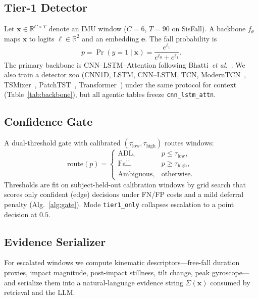 \documentclass[journal]{IEEEtran}
\begin{document}


\subsection{Tier-1 Detector}
Let $\mathbf{x}\in\mathbb{R}^{C\times T}$ denote an IMU window ($C{=}6$, $T{=}90$ on SisFall). A backbone $f_\theta$ maps $\mathbf{x}$ to logits $\boldsymbol{\ell}\in\mathbb{R}^{2}$ and an embedding $\mathbf{e}$. The fall probability is
\begin{equation}
p = \Pr(y{=}1\mid\mathbf{x}) = \frac{e^{\ell_1}}{e^{\ell_0}+e^{\ell_1}}.
\label{eq:pfall}
\end{equation}
The primary backbone is CNN--LSTM--Attention following Bhatti~\textit{et al.}~\cite{bhatti2025beyond}. We also train a detector zoo (CNN1D, LSTM, CNN--LSTM, TCN, ModernTCN~\cite{iglesias2023modern}, TSMixer~\cite{tsmixer2023}, PatchTST~\cite{patchtst2023}, Transformer~\cite{vaswani2017attention}) under the same protocol for context (Table~\ref{tab:backbone}), but all agentic tables freeze \texttt{cnn\_lstm\_attn}.

\subsection{Confidence Gate}
A dual-threshold gate with calibrated $(\tau_{\mathrm{low}},\tau_{\mathrm{high}})$ routes windows:
\begin{equation}
\mathrm{route}(p)=
\begin{cases}
\mathrm{ADL}, & p \le \tau_{\mathrm{low}},\\
\mathrm{Fall}, & p \ge \tau_{\mathrm{high}},\\
\mathrm{Ambiguous}, & \text{otherwise.}
\end{cases}
\label{eq:gate}
\end{equation}
Thresholds are fit on subject-held-out calibration windows by grid search that scores only confident (edge) decisions under FN/FP costs and a mild deferral penalty (Alg.~\ref{alg:gate}). Mode \texttt{tier1\_only} collapses escalation to a point decision at $0.5$.



\subsection{Evidence Serializer}
For escalated windows we compute kinematic descriptors---free-fall duration proxies, impact magnitude, post-impact stillness, tilt change, peak gyroscope---and serialize them into a natural-language evidence string $\Sigma(\mathbf{x})$ consumed by retrieval and the LLM.
\end{document}
